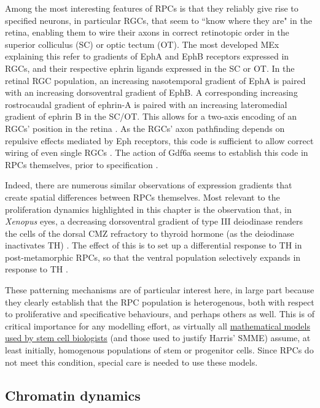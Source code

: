 \documentclass{ut-thesis}
\begin{document}
\begin{NoHyper}
Among the most interesting features of RPCs is that they reliably give rise to specified neurons, in particular RGCs, that seem to ``know where they are" in the retina, enabling them to wire their axons in correct retinotopic order in the superior colliculus (SC) or optic tectum (OT). The most developed MEx explaining this refer to gradients of EphA and EphB receptors expressed in RGCs, and their respective ephrin ligands expressed in the SC or OT. In the retinal RGC population, an increasing nasotemporal gradient of EphA is paired with an increasing dorsoventral gradient of EphB. A corresponding increasing rostrocaudal gradient of ephrin-A is paired with an increasing lateromedial gradient of ephrin B in the SC/OT. 
This allows for a two-axis encoding of an RGCs' position in the retina \cite{Tsigankov2006}. As the RGCs' axon pathfinding depends on repulsive effects mediated by Eph receptors, this code is sufficient to allow correct wiring of even single RGCs \cite{Gosse2008}. The action of Gdf6a seems to establish this code in RPCs themselves, prior to specification \cite{French2009}.

Indeed, there are numerous similar observations of expression gradients that create spatial differences between RPCs themselves. Most relevant to the proliferation dynamics highlighted in this chapter is the observation that, in \textit{Xenopus} eyes, a decreasing dorsoventral gradient of type III deiodinase renders the cells of the dorsal CMZ refractory to thyroid hormone (as the deiodinase inactivates TH) \cite{Marsh-Armstrong1999}. The effect of this is to set up a differential response to TH in post-metamorphic RPCs, so that the ventral population selectively expands in response to TH \cite{Beach1979}. 

These patterning mechanisms are of particular interest here, in large part because they clearly establish that the RPC population is heterogenous, both with respect to proliferative and specificative behaviours, and perhaps others as well. This is of critical importance for any modelling effort, as virtually all \hyperref[ssec:SSM]{mathematical models used by stem cell biologists} (and those used to justify Harris' SMME) assume, at least initially, homogenous populations of stem or progenitor cells. Since RPCs do not meet this condition, special care is needed to use these models.

\subsection{Chromatin dynamics}


\end{NoHyper}
\end{document}
